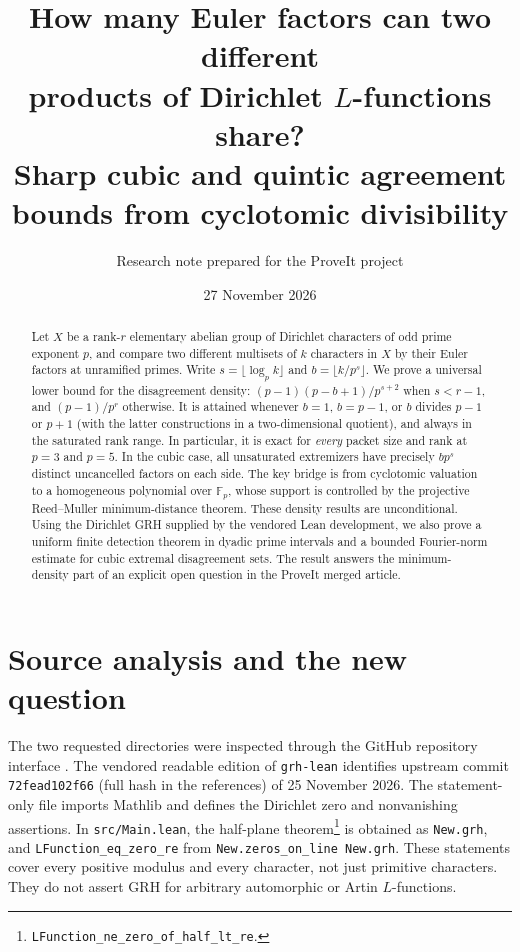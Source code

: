 \documentclass[11pt]{article}
\title{How many Euler factors can two different\texorpdfstring{\\}{ }products of Dirichlet $L$-functions share?\\[5pt]
\large Sharp cubic and quintic agreement bounds from cyclotomic divisibility}
\author{Research note prepared for the ProveIt project}
\date{27 November 2026}
\theoremstyle{definition}\newtheorem{definition}[theorem]{Definition}
\theoremstyle{remark}\newtheorem{remark}[theorem]{Remark}
\newcommand{\F}{\mathbb F}
\begin{document}
\maketitle
\begin{abstract}
Let $X$ be a rank-$r$ elementary abelian group of Dirichlet characters of odd prime exponent $p$, and compare two different multisets of $k$ characters in $X$ by their Euler factors at unramified primes. Write $s=\lfloor\log_p k\rfloor$ and $b=\lfloor k/p^s\rfloor$. We prove a universal lower bound for the disagreement density: $(p-1)(p-b+1)/p^{s+2}$ when $s<r-1$, and $(p-1)/p^r$ otherwise. It is attained whenever $b=1$, $b=p-1$, or $b$ divides $p-1$ or $p+1$ (with the latter constructions in a two-dimensional quotient), and always in the saturated rank range. In particular, it is exact for \emph{every} packet size and rank at $p=3$ and $p=5$. In the cubic case, all unsaturated extremizers have precisely $bp^s$ distinct uncancelled factors on each side. The key bridge is from cyclotomic valuation to a homogeneous polynomial over $\F_p$, whose support is controlled by the projective Reed--Muller minimum-distance theorem. These density results are unconditional. Using the Dirichlet GRH supplied by the vendored Lean development, we also prove a uniform finite detection theorem in dyadic prime intervals and a bounded Fourier-norm estimate for cubic extremal disagreement sets. The result answers the minimum-density part of an explicit open question in the ProveIt merged article.
\end{abstract}
\setcounter{tocdepth}{1}
\tableofcontents
\clearpage

\section{Source analysis and the new question}
The two requested directories were inspected through the GitHub repository interface \cite{vendor,article}. The vendored readable edition of \texttt{grh-lean} identifies upstream commit \texttt{72fead102f66} (full hash in the references) of 25 November 2026. The statement-only file imports Mathlib and defines the Dirichlet zero and nonvanishing assertions. In \texttt{src/Main.lean}, the half-plane theorem\footnote{\texttt{LFunction\_ne\_zero\_of\_half\_lt\_re}.} is obtained as \texttt{New.grh}, and \texttt{LFunction\_eq\_zero\_re} from \texttt{New.zeros\_on\_line New.grh}. These statements cover every positive modulus and every character, not just primitive characters. They do not assert GRH for arbitrary automorphic or Artin $L$-functions.
\end{document}
